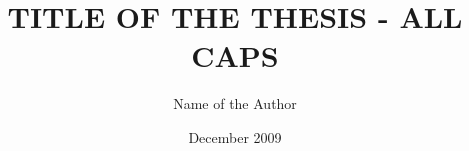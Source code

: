 \documentclass[11pt,oneandhalf,chaparabic]{metu}
\author{Name of the Author}
\title{TITLE OF THE THESIS - ALL CAPS}
\date{December 2009}
\begin{document}
\begin{preliminaries}
  \maketitle
  \makeapproval
  \plagiarism
  \setlength{\parindent}{0em}
  \setlength{\parskip}{10pt}
  \begin{abstract}\oneandhalfspacing
  \end{abstract}
  \begin{oz}\oneandhalfspacing
  \end{oz}
  \dedication{\textit{dedicated to ...}}
  \setlength{\parindent}{0em}
  \setlength{\parskip}{10pt}
  \begin{acknowledgments}\oneandhalfspacing
  \end{acknowledgments}
  \setlength{\parindent}{0em}
  \setlength{\parskip}{3pt}
  \tableofcontents
\listoftables
\listoffigures
\end{preliminaries}
\setlength{\parindent}{0em}
\setlength{\parskip}{10pt}


\newpage

\newpage

\newpage

\newpage

\newpage


\newpage

\appendix

\newpage

\newpage

\newpage

\end{document}

